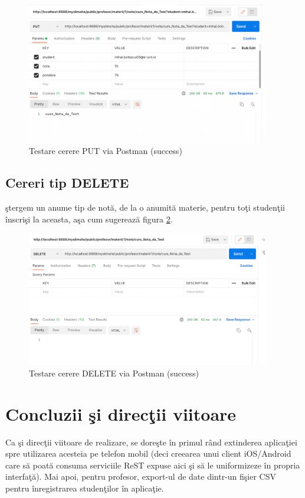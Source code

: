 \documentclass{report}
\begin{document}
\begin{figure}[h!]
    \centering
    \includegraphics[width=300pt]{img/PUT_OK.png}
    \caption{Testare cerere PUT via Postman (success)}
    \label{PUT_OK}
\end{figure}

\section{Cereri tip DELETE}

\c stergem un anume tip de notă, de la o anumită materie, pentru to\c ti studen\c tii înscri\c si la aceasta, a\c sa cum sugerează figura \ref{DELETE_OK}.


\begin{figure}[h!]
    \centering
    \includegraphics[width=300pt]{img/DELETE_OK.png}
    \caption{Testare cerere DELETE via Postman (success)}
    \label{DELETE_OK}
\end{figure}



\chapter{Concluzii \c si direc\c tii viitoare}

Ca \c si direc\c tii viitoare de realizare, se dore\c ste în primul rând extinderea aplica\c tiei spre utilizarea acesteia pe telefon mobil (deci creearea unui client iOS/Android care să poată consuma serviciile ReST expuse aici \c si să le uniformizeze în propria interfa\c tă). Mai apoi, pentru profesor, export-ul de date dintr-un fi\c sier CSV pentru înregistrarea studen\c tilor în aplica\c tie.

	
		
\end{document}

